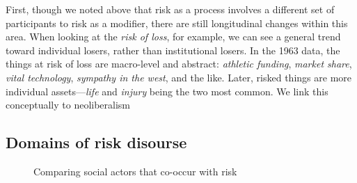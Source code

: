 First, though we noted above that risk as a process involves a different set of participants to risk as a modifier, there are still longitudinal changes within this area. When looking at the \emph{risk of loss}, for example, we can see a general trend toward individual losers, rather than institutional losers. In the 1963 data, the things at risk of loss are macro-level and abstract: \emph{athletic funding}, \emph{market share}, \emph{vital technology}, \emph{sympathy in the west}, and the like. Later, risked things are more individual assets---\emph{life} and \emph{injury} being the two most common. We link this conceptually to neoliberalism


\subsection{Domains of risk disourse}

\begin{figure}[htb!]
\centering
{}
\caption{Comparing social actors that co-occur with risk}
\label{fig:comparison}
\end{figure}

